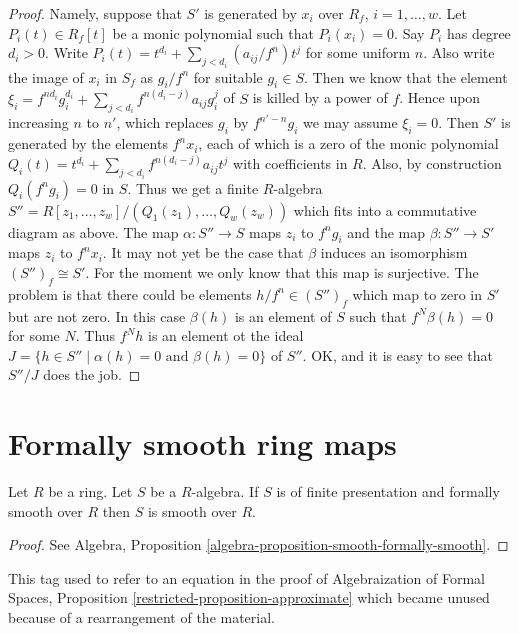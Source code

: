 \begin{proof}
Namely, suppose that $S'$ is generated by
$x_i$ over $R_f$, $i = 1, \ldots, w$. Let $P_i(t) \in R_f[t]$
be a monic polynomial such that $P_i(x_i) = 0$.
Say $P_i$ has degree $d_i > 0$. Write
$P_i(t) = t^{d_i} + \sum_{j < d_i} (a_{ij}/f^n) t^j$
for some uniform $n$. Also write
the image of $x_i$ in $S_f$ as $g_i / f^n$
for suitable $g_i \in S$. Then we know
that the element
$\xi_i = f^{nd_i} g_i^{d_i} + \sum_{j < d_i} f^{n(d_i - j)} a_{ij} g_i^j$
of $S$ is killed by a power of $f$.
Hence upon increasing $n$ to $n'$, which replaces
$g_i$ by $f^{n' - n}g_i$ we may assume $\xi_i = 0$.
Then $S'$ is generated by the elements
$f^n x_i$, each of which is a zero of the
monic polynomial $Q_i(t) = t^{d_i} +
\sum_{j < d_i} f^{n(d_i - j)} a_{ij} t^j$
with coefficients in $R$. Also, by construction
$Q_i(f^ng_i) = 0$ in $S$. Thus we get a finite $R$-algebra
$S'' = R[z_1, \ldots, z_w]/(Q_1(z_1), \ldots, Q_w(z_w))$
which fits into a commutative diagram as above.
The map $\alpha : S'' \to S$ maps $z_i$ to $f^ng_i$ and
the map $\beta : S'' \to S'$ maps $z_i$ to $f^nx_i$.
It may not yet be the case that $\beta$ induces an
isomorphism $(S'')_f \cong S'$.
For the moment we only know that this map
is surjective. The problem is that there could be
elements $h/f^n \in (S'')_f$ which map to zero
in $S'$ but are not zero. In this case $\beta(h)$
is an element of $S$ such that $f^N \beta(h) = 0$
for some $N$. Thus $f^N h$ is an element ot the ideal
$J = \{h \in S'' \mid \alpha(h) = 0 \text{ and }
\beta(h) = 0\}$ of $S''$. OK, and it is easy to see that
$S''/J$ does the job.
\end{proof}




\section{Formally smooth ring maps}
\label{section-formally-smooth}

\begin{lemma}
\label{lemma-formally-smooth-smooth}
Let $R$ be a ring. Let $S$ be a $R$-algebra.
If $S$ is of finite presentation and formally smooth over $R$
then $S$ is smooth over $R$.
\end{lemma}

\begin{proof}
See Algebra, Proposition \ref{algebra-proposition-smooth-formally-smooth}.
\end{proof}

\begin{remark}
\label{remark-equation-derivatives}
This tag used to refer to an equation in the proof of
Algebraization of Formal Spaces, Proposition
\ref{restricted-proposition-approximate}
which became unused because of a rearrangement of the material.
\end{remark}

